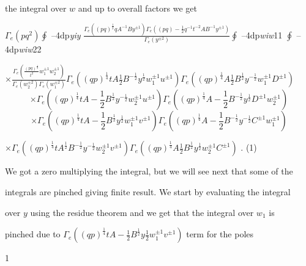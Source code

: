 \documentclass[a4paper,12pt]{article}
\begin{document}
the integral over $w$ and up to overall factors we get

$\displaystyle \Gamma_{e}(pq^{2})\oint$ --4dp{\it yiy} $\displaystyle \frac{\Gamma_{e}((pq)^{\frac{1}{2}}qA^{-1}By^{\pm 1})\Gamma_{e}((pq)-\frac{1}{2}q^{-1}t^{-2}AB^{-1}y^{\pm 1})}{\Gamma_{e}(y^{\pm 2})}\oint$ --4dp{\it wiw}11 $\displaystyle \oint$ --4dp{\it wiw}22

$\times \displaystyle \frac{\Gamma_{e}(\frac{(pq)^{\frac{1}{2}}}{t^{2}}w_{1}^{\pm 1}w_{2}^{\pm 1})}{\Gamma_{e}(w_{2}^{\pm 2})\Gamma_{e}(w_{1}^{\pm 2})}\Gamma_{e}((qp)^{\frac{1}{4}}tA\frac{1}{2}B^{-\frac{1}{2}}y^{\frac{1}{2}}w_{1}^{\pm 1}u^{\pm 1})\Gamma_{e}((qp)^{\frac{1}{4}}A\frac{1}{2}B^{\frac{1}{2}}y^{-\frac{1}{2}}w_{1}^{\pm 1}D^{\pm 1})$
$$
\times\Gamma_{e}((qp)^{\frac{1}{4}}tA-\frac{1}{2}B^{\frac{1}{2}}y^{-\frac{1}{2}}w_{2}^{\pm 1}u^{\pm 1})\Gamma_{e}((qp)^{\frac{1}{4}}A-\frac{1}{2}B^{-\frac{1}{2}}y^{\frac{1}{2}}D^{\pm 1}w_{2}^{\pm 1})
$$
$$
\times\Gamma_{e}((qp)^{\frac{1}{4}}tA-\frac{1}{2}B^{\frac{1}{2}}y^{\frac{1}{2}}w_{1}^{\pm 1}v^{\pm 1})\Gamma_{e}((qp)^{\frac{1}{4}}A-\frac{1}{2}B^{-\frac{1}{2}}y^{-\frac{1}{2}}C^{\pm 1}w_{1}^{\pm 1})
$$
\begin{center}
$\displaystyle \times\Gamma_{e}((qp)^{\frac{1}{4}}tA^{\frac{1}{2}}B^{-\frac{1}{2}}y^{-\frac{1}{2}}w_{2}^{\pm 1}v^{\pm 1})\Gamma_{e}((qp)^{\frac{1}{4}}A\frac{1}{2}B^{\frac{1}{2}}y^{\frac{1}{2}}w_{2}^{\pm 1}C^{\pm 1})$ . (1)
\end{center}
We got a zero multiplying the integral, but we will see next that some of the

integrals are pinched giving finite result. We start by evaluating the integral

over $y$ using the residue theorem and we get that the integral over $w_{1}$ is

pinched due to $\displaystyle \Gamma_{e}((qp)^{\frac{1}{4}}tA-\frac{1}{2}B^{\frac{1}{2}}y\frac{1}{2}w_{1}^{\pm 1}v^{\pm 1})$ term for the poles

1
\end{document}
